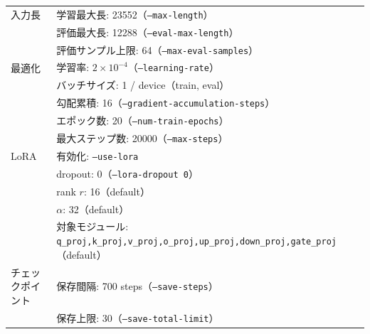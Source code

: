 \documentclass[a4j,12pt,dvipdfmx]{jsreport}
\begin{document}
\begin{table}[htbp]
\begin{threeparttable}
\begin{tabular}{ll}
      入力長         &
      学習最大長: 23552（\texttt{--max-length}）                                                                \\
                  &
      評価最大長: 12288（\texttt{--eval-max-length}）                                                           \\
                  &
      評価サンプル上限: 64（\texttt{--max-eval-samples}）                                                          \\
      \midrule
      最適化         &
      学習率: $2\times10^{-4}$（\texttt{--learning-rate}）                                                    \\
                  &
      バッチサイズ: 1 / device（train, eval）                                                                    \\
                  &
      勾配累積: 16（\texttt{--gradient-accumulation-steps}）                                                   \\
                  &
      エポック数: 20（\texttt{--num-train-epochs}）                                                             \\
                  &
      最大ステップ数: 20000（\texttt{--max-steps}）                                                               \\
      \midrule
      LoRA        &
      有効化: \texttt{--use-lora}                                                                           \\
                  &
      dropout: 0（\texttt{--lora-dropout 0}）                                                              \\
                  &
      rank $r$: 16（default）\tnote{a}                                                                     \\
                  &
      $\alpha$: 32（default）\tnote{a}                                                                     \\
                  &
      対象モジュール: \texttt{q\_proj,k\_proj,v\_proj,o\_proj,up\_proj,down\_proj,gate\_proj}（default）\tnote{a} \\
      \midrule
      チェックポイント    &
      保存間隔: 700 steps（\texttt{--save-steps}）                                                             \\
                  &
      保存上限: 30（\texttt{--save-total-limit}）                                                              \\

\end{tabular}
\end{threeparttable}
\end{table}
\end{document}
